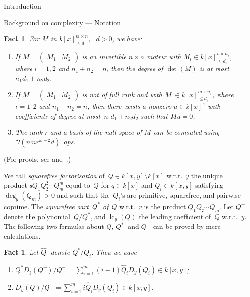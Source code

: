 \documentclass{sig-alt-full}
\newcommand{\bigOsoft}{\tilde{\mathcal{O}}}
\newcommand{\lc}{\operatorname{lc}}
\newtheorem{fact}[lemma]{Fact}
\begin{document}
\begin{section}{Introduction}
\begin{subsection}{Background on complexity --- Notation}
\begin{fact}\label{le:polymatrix}
For $M$ in $k[x]_{\leq d}^{m\times n}$, \ $d>0$, we have:
\vspace{-0.15cm}
\begin{enumerate}
  \item[(i)] If $M=\begin{pmatrix}M_1&M_2\end{pmatrix}$ is an invertible $n\times n$ matrix with $M_i\in k[x]_{\leq d_i}^{n\times n_i}$,
where $i=1,2$ and $n_1+n_2=n$, then the degree of $\det(M)$ is at most
$n_1d_1+n_2d_2$.
\vspace{-0.2cm}
  \item[(ii)] If $M=\begin{pmatrix}M_1&M_2\end{pmatrix}$ is not of full rank and with $M_i\in k[x]_{\leq d_i}^{m\times n_i}$, where $i=1,2$ and $n_1+n_2=n$, then there exists a nonzero $u\in
  k[x]^n$ with coefficients of degree at most~$n_1d_1+n_2d_2$ such that $Mu=0$.
\vspace{-0.2cm}
  \item[(iii)]The rank $r$ and a basis of the null space of $M$ can be computed using
  $\bigOsoft(nmr^{\omega-2}d)$~ops.
\end{enumerate}
\end{fact}

\noindent (For proofs, see \cite[Cor.~10.8, 5.18, 11.6]{MCA2003}
and~\cite[Th.~7.3]{Storjohann2005}.)

\smallskip

We call \emph{squarefree factorisation\/} of~$Q\in k[x, y]\setminus k[x]$
w.r.t.~$y$ the unique product $qQ_1Q_2^2\cdots Q_m^m$
equal to~$Q$ for $q\in k[x]$ and $Q_i\in k[x,y]$
satisfying~$\deg_y(Q_m)>0$ and such that the~$Q_i$'s are primitive,
squarefree, and pairwise coprime. The \emph{squarefree part~$Q^*$
of~$Q$\/} w.r.t.~$y$ is the product $Q_1 Q_2\cdots Q_m$.
Let $Q^-$ denote the polynomial~$Q/Q^*$, and $\lc_y(Q)$ the leading
coefficient of~$Q$ w.r.t.~$y$.
The following two formulas about $Q$, $Q^*$, and $Q^-$ can be proved
by mere calculations.

\begin{fact}\label{prop:deflation}
Let $\hat{Q}_i$ denote $Q^*/Q_i$. Then we have
\vspace{-0.15cm}
\begin{enumerate}
 \item[(i)]  ${Q^*D_y(Q^-)}/Q^- = \sum_{i=1}^m (i-1) \hat{Q}_i D_y(Q_i) \in k[x,
 y]$;
\vspace{-0.2cm}
 \item[(ii)] ${D_y(Q)}/Q^- = \sum_{i=1}^m i \hat{Q}_i D_y(Q_i)\in k[x, y]$.
\end{enumerate}
\end{fact}


\end{subsection}
\end{section}
\end{document}
